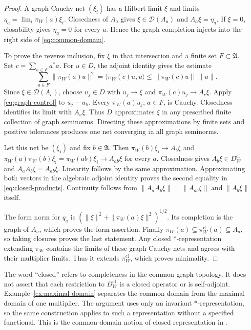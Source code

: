 \documentclass[11pt]{article}
\theoremstyle{definition}
\theoremstyle{remark}
\numberwithin{equation}{section}
\begin{document}
\begin{proof}
A graph Cauchy net $(\xi_i)$ has a Hilbert limit $\xi$ and limits
$\eta_a=\lim_i\pi_W(a)\xi_i$.  Closedness of $A_a$ gives
$\xi\in\mathcal D(A_a)$ and $A_a\xi=\eta_a$.
If $\xi=0$, closability gives $\eta_a=0$ for every $a$.
Hence the graph completion injects into the right side of
\eqref{eq:common-domain}.

To prove the reverse inclusion, fix $\xi$ in that intersection and a finite
set $F\subset\mathfrak A$.  Set $c=\sum_{a\in F}a^*a$.
For $u\in D$, the adjoint identity gives the estimate
\begin{equation}
 \sum_{a\in F}\|\pi_W(a)u\|^2
 =\langle\pi_W(c)u,u\rangle
 \leq\|\pi_W(c)u\|\,\|u\|.
 \label{eq:graph-control}
\end{equation}
Since $\xi\in\mathcal D(A_c)$, choose $u_j\in D$ with
$u_j\to\xi$ and $\pi_W(c)u_j\to A_c\xi$.
Apply \eqref{eq:graph-control} to $u_j-u_k$.
Every $\pi_W(a)u_j$, $a\in F$, is Cauchy.  Closedness identifies its
limit with $A_a\xi$.  Thus $D$ approximates $\xi$ in any prescribed
finite collection of graph seminorms.
Directing these approximations by finite sets and positive tolerances
produces one net converging in all graph seminorms.

Let this net be $(\xi_i)$ and fix $b\in\mathfrak A$.
Then $\pi_W(b)\xi_i\to A_b\xi$ and
$\pi_W(a)\pi_W(b)\xi_i=\pi_W(ab)\xi_i\to A_{ab}\xi$ for every $a$.
Closedness gives $A_b\xi\in D_W^{\mathrm{cl}}$ and
$A_aA_b\xi=A_{ab}\xi$.
Linearity follows by the same approximation.
Approximating both vectors in the algebraic adjoint identity proves
the second equality in \eqref{eq:closed-products}.
Continuity follows from
$\|A_aA_b\xi\|=\|A_{ab}\xi\|$ and $\|A_b\xi\|$ itself.

The form norm for $q_a$ is
$(\|\xi\|^2+\|\pi_W(a)\xi\|^2)^{1/2}$.
Its completion is the graph of $A_a$, which proves the form assertion.
Finally $\pi_W(a)\subseteq\pi_W^{\mathrm{cl}}(a)\subseteq A_a$,
so taking closures proves the last statement.
Any closed $*$-representation extending $\pi_W$ contains the limits of
these graph Cauchy nets and agrees with their multiplier limits.
Thus it extends $\pi_W^{\mathrm{cl}}$, which proves minimality.
\end{proof}

The word ``closed'' refers to completeness in the common graph topology.
It does not assert that each restriction to
$D_W^{\mathrm{cl}}$ is a closed operator or is self-adjoint.
Example~\ref{ex:maximal-domain} separates the common domain from the
maximal domain of one multiplier.  The argument uses only an invariant
$*$-representation, so the same construction applies to such a representation
without a specified functional.  This is the common-domain notion of
closed representation in \cite[Definition~2.4 and Lemma~2.6]{Powers1971}.
\end{document}
